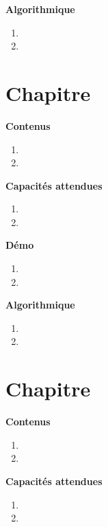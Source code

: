 \documentclass[10pt,a4paper]{article}
\begin{document}
\textbf{Algorithmique}

\begin{enumerate}
\item 
\item 
\end{enumerate}

\section{Chapitre}

\textbf{Contenus}

\begin{enumerate} 
\item 
\item 
\end{enumerate}


\textbf{Capacités attendues}

\begin{enumerate}
\item 
\item 
\end{enumerate}

\textbf{Démo}

\begin{enumerate}
\item 
\item 
\end{enumerate}

\textbf{Algorithmique}

\begin{enumerate}
\item 
\item 
\end{enumerate}

\section{Chapitre}

\textbf{Contenus}

\begin{enumerate} 
\item 
\item 
\end{enumerate}


\textbf{Capacités attendues}

\begin{enumerate}
\item 
\item 
\end{enumerate}
\end{document}
